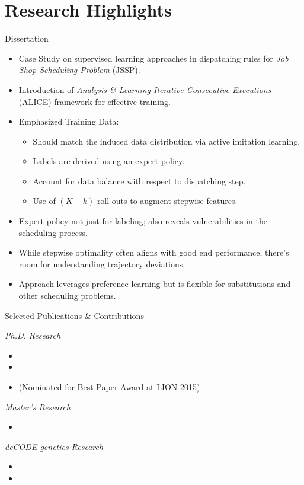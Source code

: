 \documentclass[
    NAME={Dr. Helga Ingimundardóttir},
    EMAIL={helgaingim@hi.is},
    FACULTY={Industrial Engineering},
    SUBTITLE={From Smart Algorithms in Fish Portioning to Pioneering Pipelines in Long-Range DNA Sequencing and Digital Travel},
    SEMINAR={IVT Faculty Gathering},
    DATE={September 6, 2023}
]{hi-latex/hi-beamer}
\begin{document}
\section{Research Highlights}
\begin{frame}{Dissertation}
\begin{itemize}
    \item Case Study on supervised learning approaches in dispatching rules for \emph{Job Shop Scheduling Problem} (JSSP).
    \item Introduction of \emph{Analysis \& Learning Iterative Consecutive Executions} (ALICE) framework for effective training.
    \item Emphasized Training Data:
    \begin{itemize}
        \item Should match the induced data distribution via active imitation learning.
        \item Labels are derived using an expert policy.
        \item Account for data balance with respect to dispatching step.
        \item Use of $(K-k)$ roll-outs to augment stepwise features.
    \end{itemize}
    \item Expert policy not just for labeling; also reveals vulnerabilities in the scheduling process.
    \item While stepwise optimality often aligns with good end performance, there's room for understanding trajectory deviations.
    \item Approach leverages preference learning but is flexible for substitutions and other scheduling problems.
\end{itemize}
\end{frame}

\begin{frame}{Selected Publications \& Contributions}

    \emph{Ph.D. Research}
     {\scriptsize\begin{itemize}
        \item {}
        \item {}
        \item {} (Nominated for Best Paper Award at LION 2015)
    \end{itemize}}

    \emph{Master's Research}
    {\scriptsize\begin{itemize}
    \item {}
    \end{itemize}}

    \emph{deCODE genetics Research}
    {\scriptsize\begin{itemize}
        \item {}
        \item {}
    \end{itemize}}
\end{frame}
\end{document}
